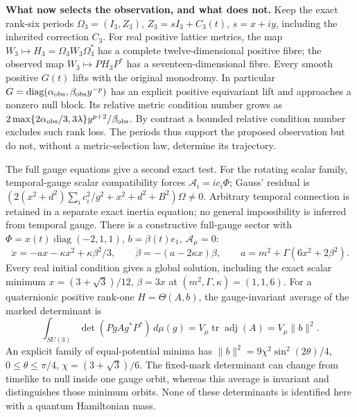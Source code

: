 \documentclass[10pt,letterpaper]{article}
\begin{document}
\noindent\textbf{What now selects the observation, and what does not.}
Keep the exact rank-six periods $\Omega_3=(I_3,Z_3)$,
$Z_3=sI_3+C_3(t)$, $s=x+iy$, including the inherited correction $C_3$.
For real positive lattice metrics, the map
$W_3\mapsto H_3=\Omega_3W_3\Omega_3^*$ has a complete
twelve-dimensional positive fibre; the observed map $W_3\mapsto PH_3P^*$
has a seventeen-dimensional fibre. Every smooth positive $G(t)$ lifts
with the original monodromy. In particular
$G=\operatorname{diag}(\alpha_{\rm obs},\beta_{\rm obs}y^{-p})$
has an explicit positive equivariant lift and approaches a nonzero null
block. Its relative metric condition number grows as
$2\max\{2\alpha_{\rm obs}/3,3\lambda\}y^{p+2}/\beta_{\rm obs}$.
By contrast a bounded relative condition number excludes such rank loss.
The periods thus support the proposed observation but do not, without
a metric-selection law, determine its trajectory.

The full gauge equations give a second exact test. For the rotating
scalar family, temporal-gauge scalar compatibility forces
$\mathcal A_i=ic_i\Phi$; Gauss' residual is
$(2(x^2+d^2)\sum_i c_i^2/g^2+x^2+d^2+B^2)\Omega\ne0$.
Arbitrary temporal connection is retained in a separate exact inertia
equation; no general impossibility is inferred from temporal gauge.
There is a constructive full-gauge sector with
$\Phi=x(t)\operatorname{diag}(-2,1,1)$,
$b=\beta(t)e_1$, $\mathcal A_\mu=0$:
\[
 \ddot x=-ax-\kappa x^2+\kappa\beta^2/3,\qquad
 \ddot\beta=-(a-2\kappa x)\beta,\qquad
 a=m^2+\Gamma(6x^2+2\beta^2).
\]
Every real initial condition gives a global solution, including the
exact scalar minimum $x=(3+\sqrt3)/12$, $\beta=3x$ at $(m^2,\Gamma,\kappa)=(1,1,6)$.
For a quaternionic positive rank-one $H=\Theta(A,b)$, the gauge-invariant
average of the marked determinant is
\[
 \int_{SU(3)}\det(PgAg^*P^*)\,d\mu(g)
 =V_\mu\operatorname{tr}\operatorname{adj}(A)=V_\mu\|b\|^2.
\]
An explicit family of equal-potential minima has
$\|b\|^2=9\chi^2\sin^2(2\theta)/4$, $0\leq\theta\leq\pi/4$,
$\chi=(3+\sqrt3)/6$. The fixed-mark determinant can change from timelike
to null inside one gauge orbit, whereas this average is invariant and
distinguishes those minimum orbits. None of these determinants is
identified here with a quantum Hamiltonian mass.
\end{document}
